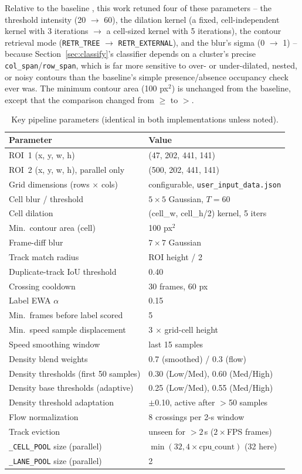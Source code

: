 \documentclass[conference]{IEEEtran}
\newcommand{\code}[1]{\texttt{#1}}
\begin{document}
Relative to the baseline \cite{baseline}, this work retuned four of
these parameters -- the threshold intensity (20 $\to$ 60), the dilation
kernel (a fixed, cell-independent kernel with 3 iterations $\to$ a
cell-sized kernel with 5 iterations), the contour retrieval mode
(\code{RETR\_TREE} $\to$ \code{RETR\_EXTERNAL}), and the blur's sigma
(0 $\to$ 1) -- because Section~\ref{sec:classify}'s classifier depends
on a cluster's precise \code{col\_span}/\code{row\_span}, which is far
more sensitive to over- or under-dilated, nested, or noisy contours
than the baseline's simple presence/absence occupancy check ever was.
The minimum contour area (100 px$^2$) is unchanged from the baseline,
except that the comparison changed from $\geq$ to $>$.

\begin{table}[t]
\centering
\caption{Key pipeline parameters (identical in both implementations
unless noted).}
\label{tab:params}
\footnotesize
\begin{tabular}{p{3.6cm}p{3.9cm}}
\toprule
\textbf{Parameter} & \textbf{Value} \\
\midrule
ROI~1 (x, y, w, h) & (47, 202, 441, 141) \\
ROI~2 (x, y, w, h), parallel only & (500, 202, 441, 141) \\
Grid dimensions (rows $\times$ cols) & configurable, \code{user\_input\_data.json} \\
Cell blur / threshold & $5\times5$ Gaussian, $T{=}60$ \\
Cell dilation & (cell\_w, cell\_h/2) kernel, 5 iters \\
Min.\ contour area (cell) & 100 px$^2$ \\
Frame-diff blur & $7\times7$ Gaussian \\
Track match radius & ROI height / 2 \\
Duplicate-track IoU threshold & 0.40 \\
Crossing cooldown & 30 frames, 60 px \\
Label EWA $\alpha$ & 0.15 \\
Min.\ frames before label scored & 5 \\
Min.\ speed sample displacement & 3 $\times$ grid-cell height \\
Speed smoothing window & last 15 samples \\
Density blend weights & 0.7 (smoothed) / 0.3 (flow) \\
Density thresholds (first 50 samples) & 0.30 (Low/Med), 0.60 (Med/High) \\
Density base thresholds (adaptive) & 0.25 (Low/Med), 0.55 (Med/High) \\
Density threshold adaptation & $\pm$0.10, active after $>$50 samples \\
Flow normalization & 8 crossings per 2-s window \\
Track eviction & unseen for $>2\,$s ($2\times$FPS frames) \\
\code{\_CELL\_POOL} size (parallel) & $\min(32, 4\times\text{cpu\_count})$ (32 here) \\
\code{\_LANE\_POOL} size (parallel) & 2 \\
\bottomrule
\end{tabular}
\end{table}
\end{document}
